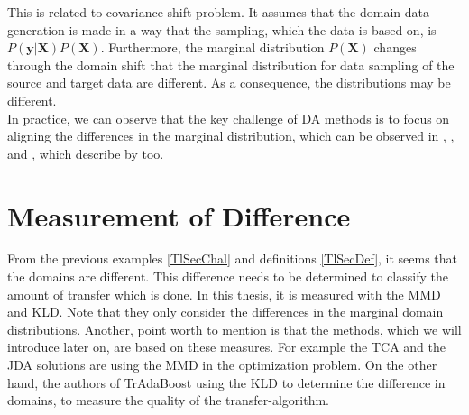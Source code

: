 This is related to covariance shift problem.\cite{Pan.2011}
It assumes that the domain data generation is made in a way that the sampling, which the data is based on, is $P(\mathbf{y}\vert \mathbf{X})P(\mathbf{X})$.
Furthermore, the marginal distribution $P(\mathbf{X})$ changes through the domain shift that the marginal distribution for data sampling of the source and target data are different. As a consequence, the distributions may be different.\cite[p. 8-9]{QuinoneroCandela.2009}\\
In practice, we can observe that the key challenge of \acl{DA} methods is to focus on aligning the differences in the marginal distribution, which can be observed in \cite{Pan.2011}, \cite{Long.}, \cite{Fernando.} and \cite{Arnold.2007}, which describe by \cite{Pan.2011} too.

\section{Measurement of Difference}\label{TlSecMeasure}
From the previous examples \ref{TlSecChal} and definitions \ref{TlSecDef}, it seems that the domains are different.
This difference needs to be determined to classify the amount of transfer which is done.
In this thesis, it is measured with the \ac{MMD} and \ac{KLD}.
Note that they only consider the differences in the marginal domain distributions.
Another, point worth to mention is that the methods, which we will introduce later on, are based on these measures.
For example the \acl{TCA} and the \acl{JDA} solutions are using the \acs{MMD} in the optimization problem.
On the other hand, the authors of TrAdaBoost using the \acs{KLD} to determine the difference in domains, to measure the quality of the transfer-algorithm.

